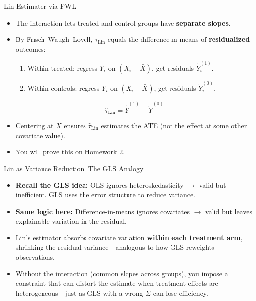 \documentclass[aspectratio=169, handout]{beamer}
\numberwithin{equation}{section}
\begin{document}
\begin{frame}{Lin Estimator via FWL}
\begin{itemize}
\item The interaction lets treated and control groups have \textbf{separate slopes}.\pause
\item By Frisch--Waugh--Lovell, $\hat{\tau}_{\text{Lin}}$ equals the difference in means of \textbf{residualized} outcomes:
\begin{enumerate}
\item Within treated: regress $Y_i$ on $(X_i-\bar{X})$, get residuals $\tilde{Y}_i^{(1)}$.
\item Within controls: regress $Y_i$ on $(X_i-\bar{X})$, get residuals $\tilde{Y}_i^{(0)}$.
\end{enumerate}
$$\hat{\tau}_{\text{Lin}}=\overline{\tilde{Y}}^{(1)}-\overline{\tilde{Y}}^{(0)}$$\pause
\item Centering at $\bar{X}$ ensures $\hat{\tau}_{\text{Lin}}$ estimates the ATE (not the effect at some other covariate value).\pause
\item You will prove this on Homework 2.
\end{itemize}
\end{frame}

\begin{frame}{Lin as Variance Reduction: The GLS Analogy}
\begin{itemize}
\item \textbf{Recall the GLS idea:} OLS ignores heteroskedasticity $\to$ valid but inefficient.  GLS uses the error structure to reduce variance.\pause
\item \textbf{Same logic here:} Difference-in-means ignores covariates $\to$ valid but leaves explainable variation in the residual.\pause
\item Lin's estimator absorbs covariate variation \textbf{within each treatment arm}, shrinking the residual variance---analogous to how GLS reweights observations.\pause
\item Without the interaction (common slopes across groups), you impose a constraint that can distort the estimate when treatment effects are heterogeneous---just as GLS with a wrong $\Sigma$ can lose efficiency.
\end{itemize}
\end{frame}
\end{document}
